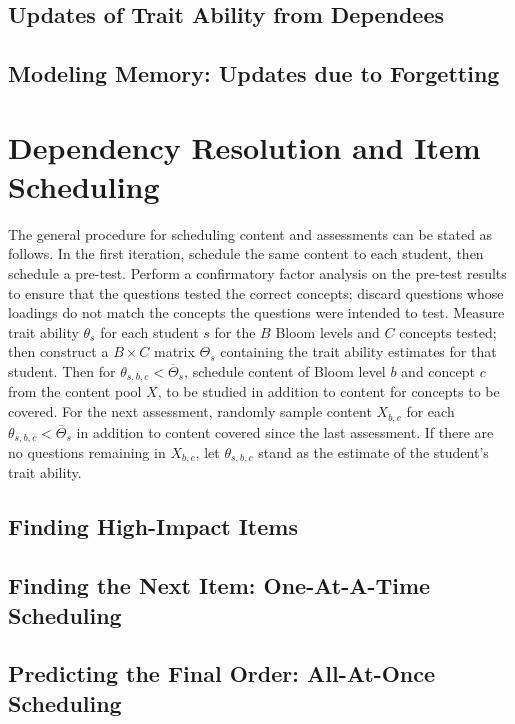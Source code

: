 \subsection{Updates of Trait Ability from Dependees}
\subsection{Modeling Memory: Updates due to Forgetting}

\section{Dependency Resolution and Item Scheduling}

The general procedure for scheduling content and assessments can be stated as
follows.  In the first iteration, schedule the same content to each student,
then schedule a pre-test. Perform a confirmatory factor analysis on the
pre-test results to ensure that the questions tested the correct concepts;
discard questions whose loadings do not match the concepts the questions were
intended to test.  Measure trait ability $\theta_s$ for each student $s$ for the $B$ Bloom
levels and $C$ concepts tested; then construct a $B \times C$ matrix $\Theta_s$
containing the trait ability estimates for that student.  Then for
$\theta_{s,b,c} < \overline{\Theta}_s$, schedule content of Bloom level $b$ and
concept $c$ from the content pool $X$, to be studied in addition to content
for concepts to be covered.  For the next assessment, randomly sample content
$X_{b,c}$ for each $\theta_{s,b,c} < \overline{\Theta}_s$ in addition to
content covered since the last assessment. If there are no questions remaining
in $X_{b,c}$, let $\theta_{s,b,c}$ stand as the estimate of the student's
trait ability.

\subsection{Finding High-Impact Items}
\subsection{Finding the Next Item: One-At-A-Time Scheduling}
\subsection{Predicting the Final Order: All-At-Once Scheduling}

